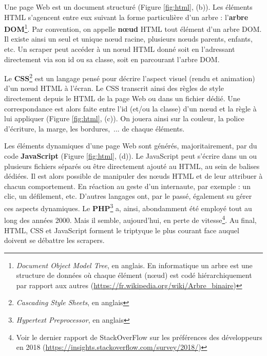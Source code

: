 \documentclass[symmetric,justified,marginals=raggedouter]{tufte-book}
\begin{document}
Une page Web est un document structuré (Figure \ref{fig:html}, (b)). Les éléments HTML s'agencent entre eux suivant la forme particulière d'un arbre : l'\textbf{arbre DOM}\footnote{\textit{Document Object Model Tree}, en anglais. En informatique un arbre est une structure de données où chaque élément (nœud) est codé hiérarchiquement par rapport aux autres (\url{https://fr.wikipedia.org/wiki/Arbre_binaire})}. Par convention, on appelle \textbf{nœud} HTML tout élément d'un arbre DOM. Il existe ainsi un seul et unique nœud racine, plusieurs nœuds parents, enfants, etc. Un scraper peut accéder à un nœud HTML donné soit en l'adressant directement via son id ou sa classe, soit en parcourant l'arbre DOM.  

Le \textbf{CSS}\footnote{\textit{Cascading Style Sheets}, en anglais} est un langage pensé pour décrire l'aspect visuel (rendu et animation) d'un nœud HTML à l'écran. Le CSS transcrit ainsi des règles de style directement depuis le HTML de la page Web ou dans un fichier dédié. Une correspondance est alors faite entre l'id (et/ou la classe) d'un nœud et la règle à lui appliquer (Figure \ref{fig:html}, (c)). On jouera ainsi sur la couleur, la police d'écriture, la marge, les bordures,~... de chaque éléments.  

Les éléments dynamiques d'une page Web sont générés, majoritairement, par du code \textbf{JavaScript} (Figure \ref{fig:html}, (d)). Le JavaScript peut s'écrire dans un ou plusieurs fichiers séparés ou être directement ajouté au HTML, au sein de balises dédiées. Il est alors possible de manipuler des nœuds HTML et de leur attribuer à chacun comportement. En réaction au geste d'un internaute, par exemple : un clic, un défilement, etc. D'autres langages ont, par le passé, également su gérer ces aspects dynamiques. Le \textbf{PHP}\footnote{\textit{Hypertext Preprocessor}, en anglais} a, ainsi, abondamment été employé tout au long des années 2000. Mais il semble, aujourd'hui, en perte de vitesse\footnote{Voir le dernier rapport de StackOverFlow sur les préférences des développeurs en 2018 (\url{https://insights.stackoverflow.com/survey/2018/})}. Au final, HTML, CSS et JavaScript forment le triptyque le plus courant face auquel doivent se débattre les scrapers.\\
\end{document}
